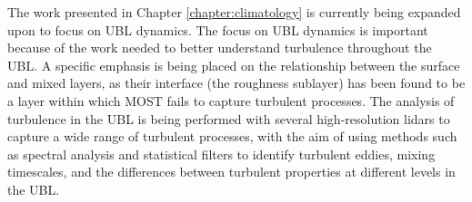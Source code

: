 The work presented in Chapter \ref{chapter:climatology} is currently being expanded upon to focus on UBL dynamics. The focus on UBL dynamics is important because of the work needed to better understand turbulence throughout the UBL. A specific emphasis is being placed on the relationship between the surface and mixed layers, as their interface (the roughness sublayer) has been found to be a layer within which MOST fails to capture turbulent processes. The analysis of turbulence in the UBL is being performed with several high-resolution lidars to capture a wide range of turbulent processes, with the aim of using methods such as spectral analysis and statistical filters to identify turbulent eddies, mixing timescales, and the differences between turbulent properties at different levels in the UBL. 
